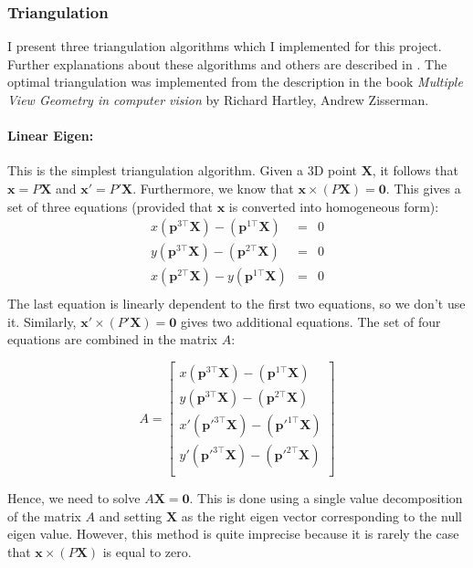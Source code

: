 \documentclass[12pt]{article}
\begin{document}
\subsubsection{Triangulation}

I present three triangulation algorithms which I implemented for this project. Further explanations about these algorithms and others are described in \cite{tri97}. The optimal triangulation was implemented from the description in the book \textit{Multiple View Geometry in computer vision} by Richard Hartley, Andrew Zisserman\cite{Geom}.

\paragraph{Linear Eigen:}

This is the simplest triangulation algorithm. Given a 3D point $\mathbf{X}$, it follows that $\mathbf{x} = P\mathbf{X}$ and $\mathbf{x}'=P'\mathbf{X}$. Furthermore, we know that $\mathbf{x} \times (P\mathbf{X}) = \mathbf{0}$. This gives a set of three equations (provided that $\textbf{x}$ is converted into homogeneous form):
\[
\left.
  \begin{array}{rcr}
    x(\mathbf{p}^{3\top}\mathbf{X}) - (\mathbf{p}^{1\top}\mathbf{X}) & = & 0\\
    y(\mathbf{p}^{3\top}\mathbf{X}) - (\mathbf{p}^{2\top}\mathbf{X}) & = & 0\\
    x(\mathbf{p}^{2\top}\mathbf{X}) - y(\mathbf{p}^{1\top}\mathbf{X}) & = & 0\\
  \end{array}
\right.
\]
The last equation is linearly dependent to the first two equations, so we don't use it. Similarly, $\mathbf{x}' \times (P'\mathbf{X}) = \mathbf{0}$ gives two additional equations. The set of four equations are combined in the matrix $A$:

\[
A = 
\left [
  \begin{array}{r}
    x(\mathbf{p}^{3\top}\mathbf{X}) - (\mathbf{p}^{1\top}\mathbf{X}) \\
    y(\mathbf{p}^{3\top}\mathbf{X}) - (\mathbf{p}^{2\top}\mathbf{X}) \\
    x'(\mathbf{p}'^{3\top}\mathbf{X}) - (\mathbf{p}'^{1\top}\mathbf{X}) \\
    y'(\mathbf{p}'^{3\top}\mathbf{X}) - (\mathbf{p}'^{2\top}\mathbf{X}) \\
  \end{array}
\right ]
\]

Hence, we need to solve $A\mathbf{X} = \mathbf{0}$. This is done using a single value decomposition of the matrix $A$ and setting $\mathbf{X}$ as the right eigen vector corresponding to the null eigen value.
However, this method is quite imprecise because it is rarely the case that $\mathbf{x} \times (P\mathbf{X})$ is equal to zero. 
\end{document}
